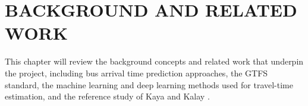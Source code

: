 \chapter{BACKGROUND AND RELATED WORK}


This chapter will review the background concepts and related work that underpin the project, including bus arrival time prediction approaches, the GTFS standard, the machine learning and deep learning methods used for travel-time estimation, and the reference study of Kaya and Kalay \cite{kaya2025}.
